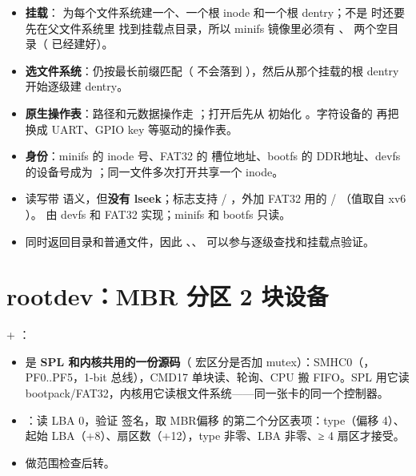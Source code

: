 \begin{itemize}
  \item \textbf{挂载}： 为每个文件系统建一个、一个根 inode 和一个根 dentry；不是 \file{/} 时还要先在父文件系统里  找到挂载点目录，所以 minifs 镜像里必须有 、 两个空目录（ 已经建好）。
  \item \textbf{选文件系统}：仍按最长前缀匹配（ 不会落到 ），然后从那个挂载的根 dentry 开始逐级建 dentry。
  \item \textbf{原生操作表}：路径和元数据操作走 ；打开后先从 初始化 。字符设备的  再把 换成 UART、GPIO key 等驱动的操作表。
  \item \textbf{身份}：minifs 的 inode 号、FAT32 的  槽位地址、bootfs 的 DDR地址、devfs 的设备号成为 ；同一文件多次打开共享一个 inode。
  \item 读写带  语义，但\textbf{没有 lseek}；标志支持  / ，外加 FAT32 用的  / （值取自 xv6 ）。 由 devfs 和 FAT32 实现；minifs 和 bootfs 只读。
  \item {} 同时返回目录和普通文件，因此 、、 可以参与逐级查找和挂载点验证。
\end{itemize}

\section{rootdev：MBR 分区 2 块设备}

 + ：

\begin{itemize}
  \item {} 是 \textbf{SPL 和内核共用的一份源码}（ 宏区分是否加 mutex）：SMHC0（，PF0..PF5，1-bit 总线），CMD17 单块读、轮询、CPU 搬 FIFO。SPL 用它读 bootpack/FAT32，内核用它读根文件系统——同一张卡的同一个控制器。
  \item {}：读 LBA 0，验证  签名，取 MBR偏移  的第二个分区表项：type（偏移 4）、起始 LBA（+8）、扇区数（+12），type 非零、LBA 非零、≥ 4 扇区才接受。
  \item {} 做范围检查后转。
\end{itemize}


